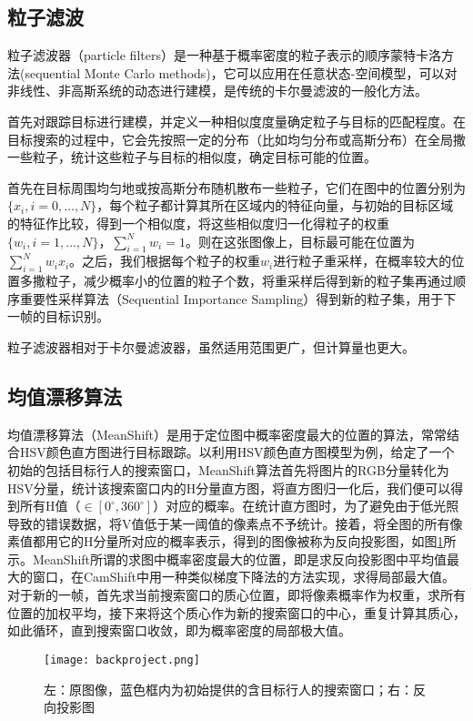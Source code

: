 \subsection{粒子滤波}

  粒子滤波器（particle filters）是一种基于概率密度的粒子表示的顺序蒙特卡洛方法(sequential Monte Carlo methods)，它可以应用在任意状态-空间模型，可以对非线性、非高斯系统的动态进行建模，是传统的卡尔曼滤波的一般化方法\cite{arulampalam2002tutorial}。

  首先对跟踪目标进行建模，并定义一种相似度度量确定粒子与目标的匹配程度。在目标搜索的过程中，它会先按照一定的分布（比如均匀分布或高斯分布）在全局撒一些粒子，统计这些粒子与目标的相似度，确定目标可能的位置。

  首先在目标周围均匀地或按高斯分布随机散布一些粒子，它们在图中的位置分别为$\{x_i,i=0,\dots,N\}$，每个粒子都计算其所在区域内的特征向量，与初始的目标区域的特征作比较，得到一个相似度，将这些相似度归一化得粒子的权重$\{w_i,i=1,\dots,N\}$，$\sum_{i=1}^N w_i = 1$。则在这张图像上，目标最可能在位置为$\sum_{i=1}^N w_i x_i$。之后，我们根据每个粒子的权重$w_i$进行粒子重采样，在概率较大的位置多撒粒子，减少概率小的位置的粒子个数，将重采样后得到新的粒子集再通过顺序重要性采样算法（Sequential Importance Sampling）得到新的粒子集，用于下一帧的目标识别。

  粒子滤波器相对于卡尔曼滤波器，虽然适用范围更广，但计算量也更大。

\subsection{均值漂移算法}
 
  均值漂移算法（MeanShift）是用于定位图中概率密度最大的位置的算法，常常结合HSV颜色直方图进行目标跟踪。以利用HSV颜色直方图模型为例，给定了一个初始的包括目标行人的搜索窗口，MeanShift算法首先将图片的RGB分量转化为HSV分量，统计该搜索窗口内的H分量直方图，将直方图归一化后，我们便可以得到所有H值（$\in [0^{\circ},360^{\circ}]$）对应的概率。在统计直方图时，为了避免由于低光照导致的错误数据，将V值低于某一阈值的像素点不予统计。接着，将全图的所有像素值都用它的H分量所对应的概率表示，得到的图像被称为反向投影图，如图\ref{fig:backproject}所示。MeanShift所谓的求图中概率密度最大的位置，即是求反向投影图中平均值最大的窗口，在CamShift中用一种类似梯度下降法的方法实现，求得局部最大值。对于新的一帧，首先求当前搜索窗口的质心位置，即将像素概率作为权重，求所有位置的加权平均，接下来将这个质心作为新的搜索窗口的中心，重复计算其质心，如此循环，直到搜索窗口收敛，即为概率密度的局部极大值。

\begin{figure}[htb]
  \centering
  \texttt{[image: backproject.png]}
  \caption{左：原图像，蓝色框内为初始提供的含目标行人的搜索窗口；右：反向投影图}
  \label{fig:backproject}
\end{figure}

